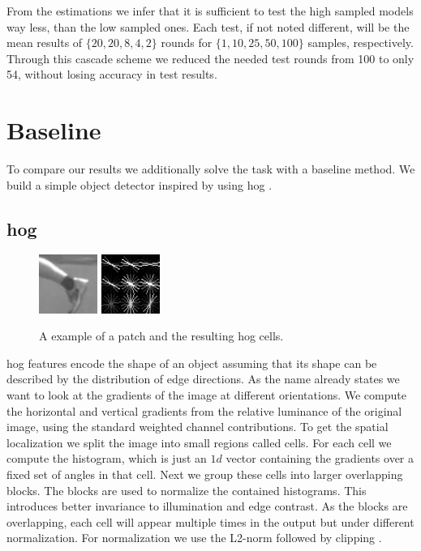 From the estimations  we infer that it is sufficient to test the high sampled models way less, than the low sampled ones. Each test, if not noted different, will be the mean results of $\{20, 20, 8, 4, 2\}$ rounds for $\{1, 10, 25, 50, 100\}$ samples, respectively. Through this cascade scheme we reduced the needed test rounds from 100 to only 54, without losing accuracy in test results.

\clearpage
\section{Baseline}
\label{sec:results:baseline}
To compare our results we additionally solve the task with a baseline method. We build a simple object detector inspired by \citet{felzenszwalb_object_2010} using \acrfull{hog} \citep{dalal_histograms_2005}.\\

\subsection{\Gls{hog}}
\begin{figure}
  \vspace{-25pt}
  \begin{center}
    \includegraphics[width=0.17\textwidth]{figures/hog_image.png}
    \includegraphics[width=0.17\textwidth]{figures/hog_feature.png}
  \end{center}
  \vspace{-5pt}
  \caption{A example of a patch and  the resulting \gls{hog} cells.}
  \vspace{-10pt}
  \label{fig:hog}
\end{figure}
\gls{hog} features encode the shape of an object assuming that its shape can be described by the distribution of edge directions. As the name already states we want to look at the gradients of the image at different orientations. We compute the horizontal and vertical gradients from the relative luminance of the original image, using the standard weighted channel contributions. To get the spatial localization we split the image into small regions called cells. For each cell we compute the histogram, which is just an $1d$ vector containing the gradients over a fixed set of angles in that cell. Next we group these cells into larger overlapping blocks. The blocks are used to normalize the contained histograms. This introduces better invariance to illumination and edge contrast. As the blocks are overlapping, each cell will appear multiple times in the output but under different normalization. For normalization we use the L2-norm followed by clipping \citep{lowe_distinctive_2004}.

